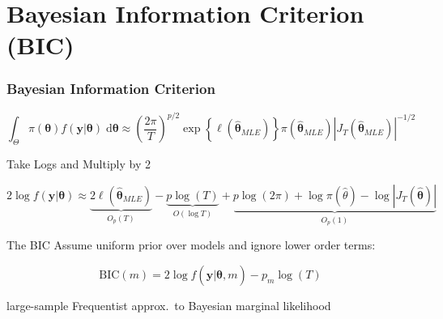 \section{Bayesian Information Criterion (BIC)}
\begin{frame}
  \frametitle{Bayesian Information Criterion}

  \vspace{-2em}

\small
  \[
    \int_\Theta \pi(\boldsymbol{\theta})f(\mathbf{y}|\boldsymbol{\theta})\;\text{d}\boldsymbol{\theta} \approx \left( \frac{2\pi}{T} \right)^{p/2}\exp\left\{ \ell(\widehat{\boldsymbol{\theta}}_{MLE})\right\} \pi(\widehat{\boldsymbol{\theta}}_{MLE})  \left|J_T(\widehat{\boldsymbol{\theta}}_{MLE})\right|^{-1/2}
  \]

  \vspace{1em}

  \pause

  \begin{block}{Take Logs and Multiply by 2}

    \vspace{-2em}
    \small
    \[2 \log f(\mathbf{y}|\boldsymbol{\theta}) \approx \underbrace{2 \ell(\widehat{\boldsymbol{\theta}}_{MLE})}_{O_p(T)} - \underbrace{p \log(T)}_{O(\log T)} + \underbrace{p \log (2\pi) + \log \pi(\widehat{\theta}) - \log |J_T(\widehat{\boldsymbol{\theta}})|}_{O_p(1)}\]
  \end{block}

  \pause

  \vspace{-2em}

  \begin{block}{The BIC}
    \normalsize
    Assume uniform prior over \alert{models} and ignore lower order terms: 

    \[
      \text{BIC}(m) = 2 \log f(\mathbf{y}|\widehat{\boldsymbol{\theta}},m) - p_m \log(T)
    \]

    large-sample Frequentist approx.\ to Bayesian marginal likelihood
  \end{block}
\end{frame}
